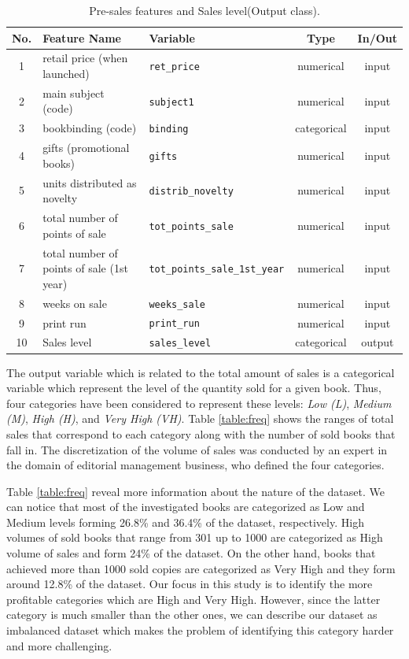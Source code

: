 \documentclass[a4paper,10pt,onecolumn,preprint,3p]{elsarticle}
\begin{document}
\begin{table}
\caption{Pre-sales features and Sales level(Output class). } 
\label{tabla:params_pre_sales}
\begin{center}
\begin{tabular}{|c|l|l|c|c|}
\hline 
No. & Feature Name & Variable & Type & In/Out\\
\hline 
1 & retail price (when launched) & \texttt{ret\_price} & numerical & input\\
2 & main subject (code) & \texttt{subject1} & numerical & input\\
3 & bookbinding (code) & \texttt{binding} & categorical & input\\
4 & gifts (promotional books) & \texttt{gifts} & numerical & input\\
5 & units distributed as novelty & \texttt{distrib\_novelty} & numerical & input\\
6 & total number of points of sale & \texttt{tot\_points\_sale} & numerical & input\\
7 & total number of points of sale (1st year) & \texttt{tot\_points\_sale\_1st\_year} & numerical & input\\
8 & weeks on sale & \texttt{weeks\_sale} & numerical & input\\
9 & print run & \texttt{print\_run} & numerical & input\\
\hline 
\hline
10 & Sales level & \texttt{sales\_level} & categorical & output\\
\hline 
\end{tabular}
\end{center}
\end{table}


The output variable which is related to the total amount of sales is a categorical variable which represent the level of the quantity sold for a given book. Thus, four categories have been considered to represent these levels: \textit{Low (L)}, \textit{Medium (M)}, \textit{High (H)}, and \textit{Very High (VH)}. Table \ref{table:freq} shows the ranges of total sales that correspond to each category along with the number of sold books that fall in. The discretization of the volume of sales was conducted by an expert in the domain of editorial management business, who defined the four categories.

Table \ref{table:freq} reveal more information about the nature of the dataset. We can notice that most of the investigated books are categorized as Low and Medium levels forming 26.8\% and 36.4\% of the dataset, respectively. High volumes of sold books that range from 301 up to 1000 are categorized as High volume of sales and form 24\% of the dataset. On the other hand, books that achieved more than 1000 sold copies are categorized as Very High and they form around 12.8\% of the dataset. Our focus in this study is to identify the more profitable categories which are High and Very High. However, since the latter category is much smaller than the other ones, we can describe our dataset as imbalanced dataset which makes the problem of identifying this category harder and more challenging.
\end{document}
